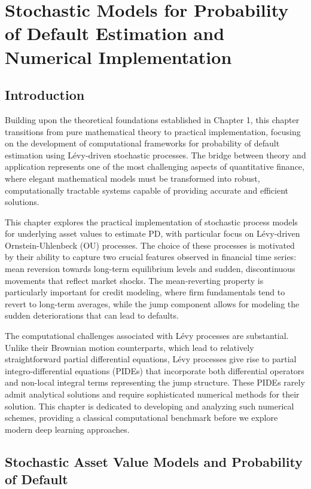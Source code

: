 \documentclass[11pt,twoside,openright]{report}
\begin{document}
\chapter{Stochastic Models for Probability of Default Estimation and Numerical Implementation}

\section{Introduction}



Building upon the theoretical foundations established in Chapter 1, this chapter transitions from pure mathematical theory to practical implementation, focusing on the development of computational frameworks for probability of default estimation using Lévy-driven stochastic processes. The bridge between theory and application represents one of the most challenging aspects of quantitative finance, where elegant mathematical models must be transformed into robust, computationally tractable systems capable of providing accurate and efficient solutions.

This chapter explores the practical implementation of stochastic process models for underlying asset values to estimate PD, with particular focus on Lévy-driven Ornstein-Uhlenbeck (OU) processes. The choice of these processes is motivated by their ability to capture two crucial features observed in financial time series: mean reversion towards long-term equilibrium levels and sudden, discontinuous movements that reflect market shocks. The mean-reverting property is particularly important for credit modeling, where firm fundamentals tend to revert to long-term averages, while the jump component allows for modeling the sudden deteriorations that can lead to defaults.

The computational challenges associated with Lévy processes are substantial. Unlike their Brownian motion counterparts, which lead to relatively straightforward partial differential equations, Lévy processes give rise to partial integro-differential equations (PIDEs) that incorporate both differential operators and non-local integral terms representing the jump structure. These PIDEs rarely admit analytical solutions and require sophisticated numerical methods for their solution. This chapter is dedicated to developing and analyzing such numerical schemes, providing a classical computational benchmark before we explore modern deep learning approaches.

\section{Stochastic Asset Value Models and Probability of Default}
\end{document}

